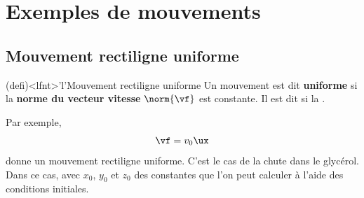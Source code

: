 \documentclass[../../main/main.tex]{subfiles}
\begin{document}
\section{Exemples de mouvements}

\subsection{Mouvement rectiligne uniforme}
\begin{tcb*}(defi)<lfnt>'l'{Mouvement rectiligne uniforme}
	Un mouvement est dit \textbf{uniforme} si la \textbf{norme du vecteur vitesse}
	$\norm{\vf}$ est constante. Il est dit  si la .
\end{tcb*}
Par exemple,
\[\vf = v_0\ux\]
donne un mouvement rectiligne uniforme. C'est le cas de la chute dans le
glycérol. Dans ce cas,
\psw{
	\[
		\left\{
		\begin{array}{l}
			\xp(t) = v_0 \\
			\yp(t) = 0   \\
			\zp(t) = 0
		\end{array}
		\right.
		\Longrightarrow
		\left\{
		\begin{array}{l}
			x(t) = v_0t + x_0 \\
			y(t) = y_0        \\
			z(t) = z_0
		\end{array}
		\right.
	\]}
avec $x_0$, $y_0$ et $z_0$ des constantes que l'on peut calculer à l'aide des
conditions initiales.
\end{document}
